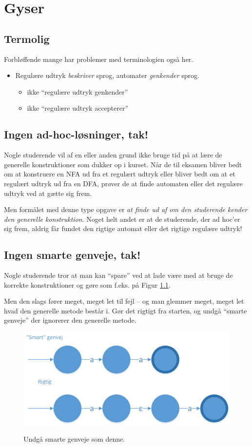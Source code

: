 \documentclass[a4paper,10pt,article]{memoir}
\begin{document}
\chapter{Gyser}

\section{Termolig}

Forbløffende mange har problemer med terminologien også her.

\begin{itemize}
\item Regulære udtryk \emph{beskriver} sprog, automater \emph{genkender} sprog.
\begin{itemize}
\item ikke ``regulære udtryk genkender''
\item ikke ``regulære udtryk accepterer''
\end{itemize}
\end{itemize}

\section{Ingen ad-hoc-løsninger, tak!}

Nogle studerende vil af en eller anden grund ikke bruge tid på at lære
de generelle konstruktioner som dukker op i kurset. Når de til eksamen
bliver bedt om at konstruere en NFA ud fra et regulært udtryk eller
bliver bedt om at et regulært udtryk ud fra en DFA, prøver de at finde
automaten eller det regulære udtryk ved at gætte sig frem.

Men formålet med denne type opgave er \emph{at finde ud af om den
  studerende kender den generelle konstruktion}. Noget helt andet er
at de studerende, der ad hoc'er sig frem, aldrig får fundet den
rigtige automat eller det rigtige regulære udtryk!


\section{Ingen smarte genveje, tak!}

Nogle studerende tror at man kan ``spare'' ved at lade være med at
bruge de korrekte konstruktioner og gøre som f.eks. på Figur
\ref{fig:fig23}. 

Men den slags fører meget, meget let til fejl -- og man glemmer meget,
meget let hvad den generelle metode består i. Gør det rigtigt fra
starten, og undgå ``smarte genveje'' der ignorerer den generelle
metode.

\begin{figure}[H]%
{\centering 
\includegraphics[width=\textwidth]{Fig23x.png}
}
\caption{Undgå smarte genveje som denne.}
\label{fig:fig23}
\end{figure}
\end{document}
